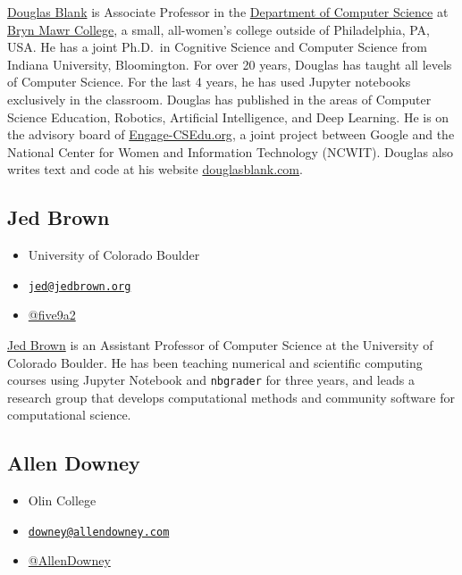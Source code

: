 \documentclass[]{book}
\providecommand{\tightlist}{%
  \setlength{\itemsep}{0pt}\setlength{\parskip}{0pt}}
\begin{document}
\href{https://cs.brynmawr.edu/~dblank/}{Douglas Blank} is Associate
Professor in the \href{https://cs.brynmawr.edu/}{Department of Computer
Science} at \href{http://brynmawr.edu/}{Bryn Mawr College}, a small,
all-women's college outside of Philadelphia, PA, USA. He has a joint
Ph.D.~in Cognitive Science and Computer Science from Indiana University,
Bloomington. For over 20 years, Douglas has taught all levels of
Computer Science. For the last 4 years, he has used Jupyter notebooks
exclusively in the classroom. Douglas has published in the areas of
Computer Science Education, Robotics, Artificial Intelligence, and Deep
Learning. He is on the advisory board of
\href{https://www.engage-csedu.org}{Engage-CSEdu.org}, a joint project
between Google and the National Center for Women and Information
Technology (NCWIT). Douglas also writes text and code at his website
\href{http://douglasblank.com}{douglasblank.com}.

\subsection*{Jed Brown}\label{jed-brown}

\begin{itemize}
\tightlist
\item
  University of Colorado Boulder
\item
  \href{mailto:jed@jedbrown.org}{\nolinkurl{jed@jedbrown.org}}
\item
  \href{https://twitter.com/five9a2}{@five9a2}
\end{itemize}

\href{https://jedbrown.org/}{Jed Brown} is an Assistant Professor of
Computer Science at the University of Colorado Boulder. He has been
teaching numerical and scientific computing courses using Jupyter
Notebook and \texttt{nbgrader} for three years, and leads a research
group that develops computational methods and community software for
computational science.

\subsection*{Allen Downey}\label{allen-downey}

\begin{itemize}
\tightlist
\item
  Olin College
\item
  \href{mailto:downey@allendowney.com}{\nolinkurl{downey@allendowney.com}}
\item
  \href{https://twitter.com/AllenDowney}{@AllenDowney}
\end{itemize}
\end{document}
